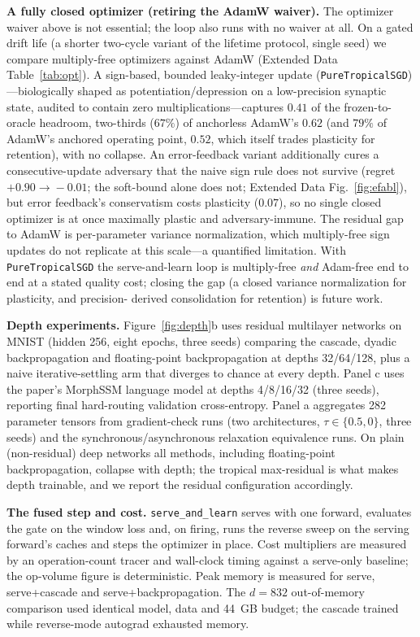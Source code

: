 \documentclass[sn-nature]{sn-jnl}   %
\newcommand{\heading}[1]{\vspace{4pt}\noindent\textbf{#1}\hspace{0.6em}}
\begin{document}
\heading{A fully closed optimizer (retiring the AdamW waiver).}
The optimizer waiver above is not essential; the loop also runs with no waiver at
all. On a gated drift life (a shorter two-cycle variant of the lifetime protocol,
single seed) we compare multiply-free optimizers against AdamW (Extended Data
Table~\ref{tab:opt}). A sign-based, bounded leaky-integer update
(\texttt{PureTropicalSGD})---biologically shaped as potentiation/depression on a
low-precision synaptic state\cite{bartol2015nanoconnectomic}, audited to contain
zero multiplications---captures $0.41$ of the frozen-to-oracle headroom,
two-thirds ($67\%$) of anchorless AdamW's $0.62$ (and $79\%$ of AdamW's anchored
operating point, $0.52$, which itself trades plasticity for retention), with no
collapse. An error-feedback
variant additionally cures a consecutive-update adversary that the naive sign rule
does not survive (regret $+0.90\!\to\!-0.01$; the soft-bound alone does not;
Extended Data Fig.~\ref{fig:efabl}), but error feedback's conservatism costs
plasticity ($0.07$), so no single closed optimizer is at once maximally plastic and
adversary-immune. The residual gap to AdamW is per-parameter variance
normalization, which multiply-free sign updates do not replicate at this
scale---a quantified limitation. With \texttt{PureTropicalSGD} the serve-and-learn
loop is multiply-free \emph{and} Adam-free end to end at a stated quality cost;
closing the gap (a closed variance normalization for plasticity, and precision-%
derived consolidation for retention) is future work.

\heading{Depth experiments.}
Figure~\ref{fig:depth}b uses residual multilayer networks on MNIST (hidden 256,
eight epochs, three seeds) comparing the cascade, dyadic backpropagation and
floating-point backpropagation at depths 32/64/128, plus a naive
iterative-settling arm that diverges to chance at every depth. Panel c uses the
paper's MorphSSM language model at depths 4/8/16/32 (three seeds), reporting
final hard-routing validation cross-entropy. Panel a aggregates 282 parameter
tensors from gradient-check runs (two architectures, $\tau\in\{0.5,0\}$, three
seeds) and the synchronous/asynchronous relaxation equivalence runs. On plain
(non-residual) deep networks all methods, including floating-point
backpropagation, collapse with depth; the tropical max-residual is what makes
depth trainable, and we report the residual configuration accordingly.

\heading{The fused step and cost.}
\texttt{serve\_and\_learn} serves with one forward, evaluates the gate on the
window loss and, on firing, runs the reverse sweep on the serving forward's
caches and steps the optimizer in place. Cost multipliers are measured by an
operation-count tracer and wall-clock timing against a serve-only baseline; the
op-volume figure is deterministic. Peak memory is measured for serve,
serve+cascade and serve+backpropagation. The $d{=}832$ out-of-memory comparison
used identical model, data and 44~GB budget; the cascade trained while
reverse-mode autograd exhausted memory.
\end{document}
